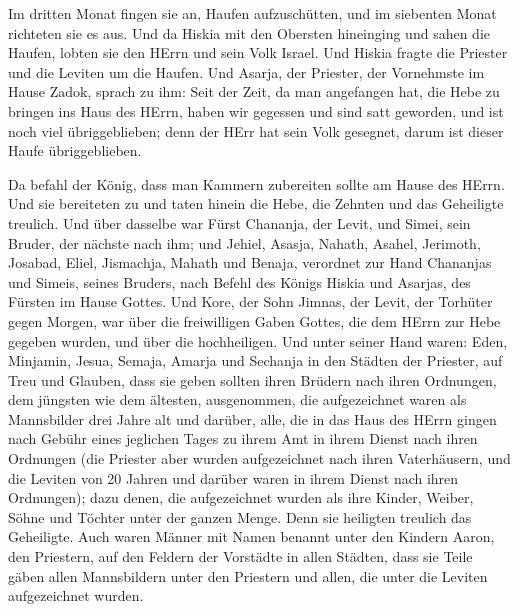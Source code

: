  Im dritten Monat fingen sie an, Haufen aufzuschütten, und
im siebenten Monat richteten sie es aus.  Und da Hiskia mit
den Obersten hineinging und sahen die Haufen, lobten sie den HErrn und
sein Volk Israel.  Und Hiskia fragte die Priester und die
Leviten um die Haufen.  Und Asarja, der Priester, der
Vornehmste im Hause Zadok, sprach zu ihm: Seit der Zeit, da man
angefangen hat, die Hebe zu bringen ins Haus des HErrn, haben wir
gegessen und sind satt geworden, und ist noch viel übriggeblieben; denn
der HErr hat sein Volk gesegnet, darum ist dieser Haufe übriggeblieben.

 Da befahl der König, dass man Kammern zubereiten sollte am
Hause des HErrn. Und sie bereiteten zu  und taten hinein
die Hebe, die Zehnten und das Geheiligte treulich. Und über dasselbe war
Fürst Chananja, der Levit, und Simei, sein Bruder, der nächste nach ihm;
 und Jehiel, Asasja, Nahath, Asahel, Jerimoth, Josabad,
Eliel, Jismachja, Mahath und Benaja, verordnet zur Hand Chananjas und
Simeis, seines Bruders, nach Befehl des Königs Hiskia und Asarjas, des
Fürsten im Hause Gottes.  Und Kore, der Sohn Jimnas, der
Levit, der Torhüter gegen Morgen, war über die freiwilligen Gaben
Gottes, die dem HErrn zur Hebe gegeben wurden, und über die
hochheiligen.  Und unter seiner Hand waren: Eden, Minjamin,
Jesua, Semaja, Amarja und Sechanja in den Städten der Priester, auf Treu
und Glauben, dass sie geben sollten ihren Brüdern nach ihren Ordnungen,
dem jüngsten wie dem ältesten,  ausgenommen, die
aufgezeichnet waren als Mannsbilder drei Jahre alt und darüber, alle,
die in das Haus des HErrn gingen nach Gebühr eines jeglichen Tages zu
ihrem Amt in ihrem Dienst nach ihren Ordnungen  (die
Priester aber wurden aufgezeichnet nach ihren Vaterhäusern, und die
Leviten von 20 Jahren und darüber waren in ihrem Dienst nach ihren
Ordnungen);  dazu denen, die aufgezeichnet wurden als ihre
Kinder, Weiber, Söhne und Töchter unter der ganzen Menge. Denn sie
heiligten treulich das Geheiligte.  Auch waren Männer mit
Namen benannt unter den Kindern Aaron, den Priestern, auf den Feldern
der Vorstädte in allen Städten, dass sie Teile gäben allen Mannsbildern
unter den Priestern und allen, die unter die Leviten aufgezeichnet
wurden.

